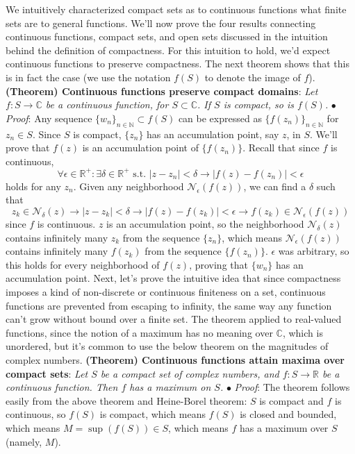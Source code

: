 \documentclass{article}
\newcommand*{\tb}{\textbf}
\newcommand*{\ti}{\textit}
\newcommand*{\n}{\newline}
\newcommand*{\nn}{\newline \newline}
\newcommand*{\Pf}{\indent \ensuremath{\bullet} \textit{Proof}: }
\newcommand*{\N}{\mathbb{N}}
\newcommand*{\R}{\mathbb{R}}
\newcommand*{\C}{\mathbb{C}}
\newcommand*{\st}{\text{ s.t. }}
\begin{document}
\nn
We intuitively characterized compact sets as to continuous functions what finite sets are to general functions. We'll now prove the four results connecting continuous functions, compact sets, and open sets discussed in the intuition behind the definition of compactness. For this intuition to hold, we'd expect continuous functions to preserve compactness. The next theorem shows that this is in fact the case (we use the notation $ f(S) $ to denote the image of $ f $).
\nn
\tb{(Theorem) Continuous functions preserve compact domains}: \ti{Let $ f: S \rightarrow \C $ be a continuous function, for $ S \subset \C $. If $ S $ is compact, so is $ f(S) $.}
\n
\Pf Any sequence $ \{ w_n \}_{n \in \N}\subset f(S) $ can be expressed as $ \{ f(z_n) \}_{n \in \N} $ for $ z_n \in S $. Since $ S $ is compact, $ \{ z_n \} $ has an accumulation point, say $ z $, in $ S $. We'll prove that $ f(z) $ is an accumulation point of $ \{ f(z_n) \} $. Recall that since $ f $ is continuous,
$$ \forall \epsilon \in \R^+: \exists \delta \in \R^+ \st | z - z_n | < \delta \rightarrow | f(z) - f(z_n) | < \epsilon $$
holds for any $ z_n $. Given any neighborhood $ \mathcal{N}_\epsilon(f(z)) $, we can find a $ \delta $ such that
$$ z_k \in \mathcal{N}_\delta(z) \rightarrow | z - z_k | < \delta \rightarrow | f(z) - f(z_k) | < \epsilon \rightarrow f(z_k) \in \mathcal{N}_\epsilon(f(z)) $$
since $ f $ is continuous. $ z $ is an accumulation point, so the neighborhood $ \mathcal{N}_\delta(z) $ contains infinitely many $ z_k $ from the sequence $ \{ z_n \} $, which means $ \mathcal{N}_\epsilon(f(z)) $ contains infinitely many $ f(z_k) $ from the sequence $ \{ f(z_n) \} $. $ \epsilon $ was arbitrary, so this holds for every neighborhood of $ f(z) $, proving that $ \{ w_n \} $ has an accumulation point. \qedsymbol
\nn
Next, let's prove the intuitive idea that since compactness imposes a kind of non-discrete or continuous finiteness on a set, continuous functions are prevented from escaping to infinity, the same way any function can't grow without bound over a finite set. The theorem applied to real-valued functions, since the notion of a maximum has no meaning over $ \C $, which is unordered, but it's common to use the below theorem on the magnitudes of complex numbers.
\nn
\tb{(Theorem) Continuous functions attain maxima over compact sets}: \ti{Let $ S $ be a compact set of complex numbers, and $ f: S \rightarrow \R $ be a continuous function. Then $ f $ has a maximum on $ S $.}
\n
\Pf The theorem follows easily from the above theorem and Heine-Borel theorem: $ S $ is compact and $ f $ is continuous, so $ f(S) $ is compact, which means $ f(S) $ is closed and bounded, which means $ M = \sup(f(S)) \in S $, which means $ f $ has a maximum over $ S $ (namely, $ M $). \qedsymbol
\end{document}
